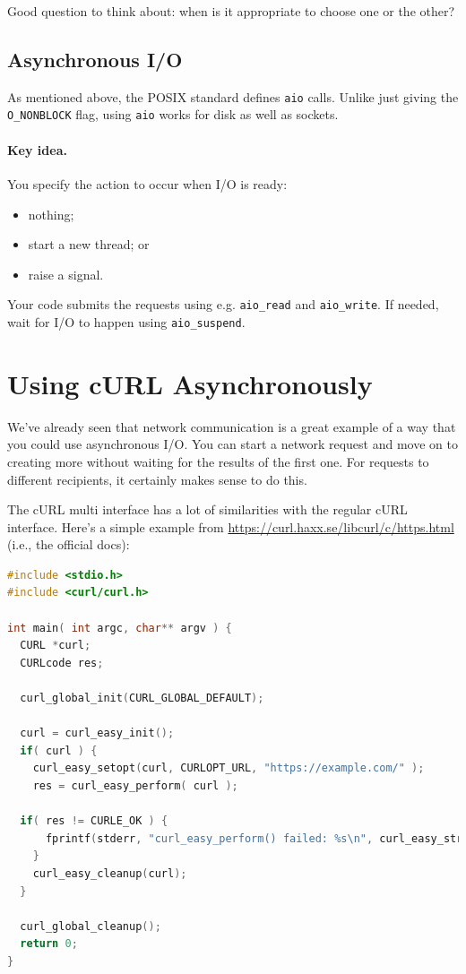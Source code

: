 \documentclass[a4paper]{report}
\begin{document}
Good question to think about: when is it appropriate to choose one or the other?

\subsection*{Asynchronous I/O}
As mentioned above, the POSIX standard defines {\tt aio} calls.
Unlike just giving the {\tt O\_NONBLOCK} flag, using {\tt aio} works
for disk as well as sockets.

\paragraph{Key idea.} You specify the action to occur when I/O is ready:
    \begin{itemize}
      \item nothing;
      \item start a new thread; or
      \item raise a signal.
    \end{itemize}

Your code submits the requests using e.g. {\tt aio\_read} and {\tt aio\_write}.
If needed, wait for I/O to happen using {\tt aio\_suspend}.

\section*{Using cURL Asynchronously}
We've already seen that network communication is a great example of a way that you could use asynchronous  I/O. You can start a network request and move on to creating more without waiting for the results of the first one. For requests to different recipients, it certainly makes sense to do this.

The cURL multi interface has a lot of similarities with the regular cURL interface. Here's a simple example from \url{https://curl.haxx.se/libcurl/c/https.html} (i.e., the official docs):

\begin{lstlisting}[language=C]
#include <stdio.h>
#include <curl/curl.h>
 
int main( int argc, char** argv ) {
  CURL *curl;
  CURLcode res;
 
  curl_global_init(CURL_GLOBAL_DEFAULT);
 
  curl = curl_easy_init();
  if( curl ) {
    curl_easy_setopt(curl, CURLOPT_URL, "https://example.com/" );
    res = curl_easy_perform( curl );
    
  if( res != CURLE_OK ) {
      fprintf(stderr, "curl_easy_perform() failed: %s\n", curl_easy_strerror(res));
    }
    curl_easy_cleanup(curl);
  }
 
  curl_global_cleanup();
  return 0;
}
\end{lstlisting}
\end{document}
